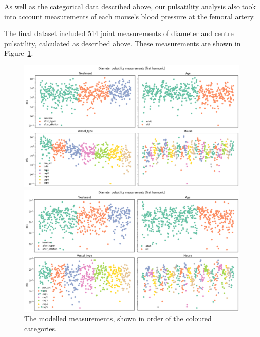\documentclass[
  letterpaper,
  DIV=11,
  numbers=noendperiod,
  oneside]{scrartcl}
\theoremstyle{plain}
\theoremstyle{remark}
\begin{document}
As well as the categorical data described above, our pulsatility
analysis also took into account measurements of each mouse's blood
pressure at the femoral artery.

The final dataset included 514 joint measurements of diameter and centre
pulsatility, calculated as described above. These measurements are shown
in Figure~\ref{fig-pulsatility-dataset}.

\begin{figure}

\begin{minipage}{\linewidth}
\includegraphics{../plots/pulsatility-diameter-measurements.png}\end{minipage}%
\newline
\begin{minipage}{\linewidth}
\includegraphics{../plots/pulsatility-center-measurements.png}\end{minipage}%

\caption{\label{fig-pulsatility-dataset}The modelled measurements, shown
in order of the coloured categories.}

\end{figure}%
\end{document}
